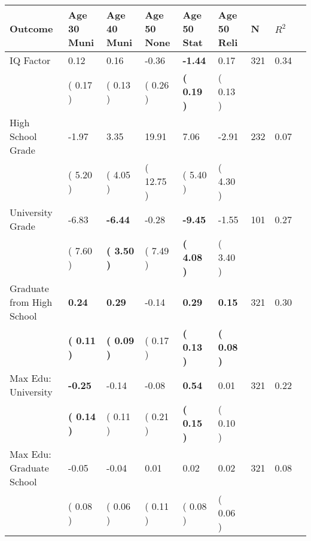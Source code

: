 \begin{tabular}{L{6.2cm} C{1.8cm} C{1.8cm} C{1.8cm} C{1.8cm} C{1.8cm} C{1.8cm} C{0.3cm} C{0.3cm}}
\toprule
 \textbf{Outcome} & \textbf{Age 30 Muni} & \textbf{Age 40 Muni} & \textbf{Age 50 None} & \textbf{Age 50 Stat} & \textbf{Age 50 Reli} & \textbf{N} & \textbf{$ R^2$} \\
\midrule
IQ Factor &      0.12 &      0.16 &     -0.36 & \textbf{    -1.44} &      0.17  & 321 &       0.34 \\ 
 & (     0.17 ) & (     0.13 ) & (     0.26 ) & \textbf{(     0.19 )} & (     0.13 )  & \\
High School Grade &     -1.97 &      3.35 &     19.91 &      7.06 &     -2.91  & 232 &       0.07 \\ 
 & (     5.20 ) & (     4.05 ) & (    12.75 ) & (     5.40 ) & (     4.30 )  & \\
University Grade &     -6.83 & \textbf{    -6.44} &     -0.28 & \textbf{    -9.45} &     -1.55  & 101 &       0.27 \\ 
 & (     7.60 ) & \textbf{(     3.50 )} & (     7.49 ) & \textbf{(     4.08 )} & (     3.40 )  & \\
Graduate from High School & \textbf{     0.24} & \textbf{     0.29} &     -0.14 & \textbf{     0.29} & \textbf{     0.15}  & 321 &       0.30 \\ 
 & \textbf{(     0.11 )} & \textbf{(     0.09 )} & (     0.17 ) & \textbf{(     0.13 )} & \textbf{(     0.08 )}  & \\
Max Edu: University & \textbf{    -0.25} &     -0.14 &     -0.08 & \textbf{     0.54} &      0.01  & 321 &       0.22 \\ 
 & \textbf{(     0.14 )} & (     0.11 ) & (     0.21 ) & \textbf{(     0.15 )} & (     0.10 )  & \\
Max Edu: Graduate School &     -0.05 &     -0.04 &      0.01 &      0.02 &      0.02  & 321 &       0.08 \\ 
 & (     0.08 ) & (     0.06 ) & (     0.11 ) & (     0.08 ) & (     0.06 )  & \\
\bottomrule
\end{tabular}
